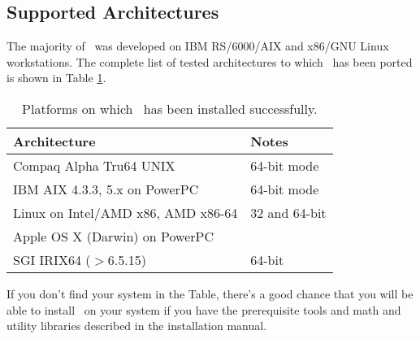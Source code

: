 \subsection{Supported Architectures}
The majority of \PSIthree\ was developed on IBM RS/6000/AIX
and x86/GNU Linux workstations. The complete list of
tested architectures to which \PSIthree\ has
been ported is shown in Table \ref{table:ports}.
\begin{table}[h]
\caption{Platforms on which \PSIthree\ has been installed successfully.}
\label{table:ports}
\begin{center}
\begin{tabular}{ll} \hline\hline
Architecture              &  Notes \\ \hline
Compaq Alpha Tru64 UNIX   & 64-bit mode \\
IBM AIX 4.3.3, 5.x on PowerPC & 64-bit mode \\
Linux on Intel/AMD x86, AMD x86-64  & 32 and 64-bit\\
Apple OS X (Darwin) on PowerPC & \\
SGI IRIX64 ($>$6.5.15)    & 64-bit \\ \hline\hline
\end{tabular}
\end{center}
\end{table}
If you don't find your system in the Table, there's a good chance
that you will be able to install \PSIthree\ on your system
if you have the prerequisite tools and math and utility libraries described 
in the installation manual.

